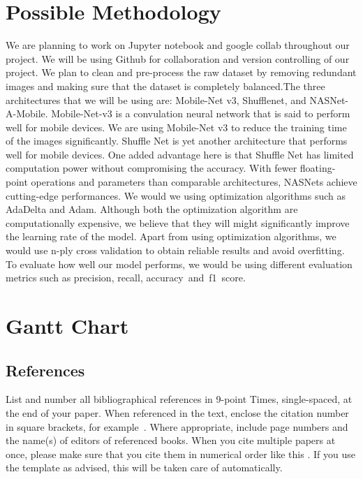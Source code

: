 \documentclass[10pt,twocolumn,letterpaper]{article}
\begin{document}
  \section{Possible Methodology}
We are planning to work on Jupyter notebook and google collab throughout our project. We will be using Github for collaboration and version controlling of our project. We plan to clean and pre-process the raw dataset by removing redundant images and making sure that the dataset is completely balanced.The three architectures that we will be using are: Mobile-Net v3, Shufflenet, and NASNet-A-Mobile. Mobile-Net-v3 is a convulation neural network that is said to perform well for mobile devices. We are using Mobile-Net v3 to reduce the training time of the images significantly. Shuffle Net is yet another architecture that performs well for mobile devices. One added advantage here is that Shuffle Net has limited computation power without compromising the accuracy. With fewer floating-point operations and parameters than comparable architectures, NASNets achieve cutting-edge performances. We would we using optimization algorithms such as AdaDelta and Adam. Although both the optimization algorithm are computationally expensive, we believe that they will might significantly improve the learning rate of the model. Apart from using optimization algorithms, we would use n-ply cross validation to obtain reliable results and avoid overfitting. To evaluate how well our model performs, we would be using different evaluation metrics such as precision, recall, accuracy and f1 score.

\pagebreak

  \section{Gantt Chart}

  

  \subsection{References}

  List and number all bibliographical references in 9-point Times, single-spaced, at the end of your paper.
  When referenced in the text, enclose the citation number in square brackets, for
  example~\cite{Authors14}.
  Where appropriate, include page numbers and the name(s) of editors of referenced books.
  When you cite multiple papers at once, please make sure that you cite them in numerical order like this \cite{Alpher02,Alpher03,Alpher05,Authors14b,Authors14}.
  If you use the template as advised, this will be taken care of automatically.


  



  {\small
  
  
  }

  
\end{document}
